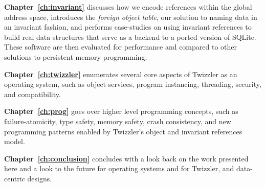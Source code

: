 \vspace{2em}

\noindent\textbf{Chapter~\ref{ch:invariant}} discusses how we encode references within the global address space, introduces the
\emph{foreign object table}, our solution to naming data in an invariant fashion, and performs case-studies on using
invariant references to build real data structures that serve as a backend to a ported version of SQLite. These software
are then evaluated for performance and compared to other solutions to persistent memory programming.

\vspace{2em}

\noindent\textbf{Chapter~\ref{ch:twizzler}} enumerates several core aspects of Twizzler as an operating system, such as object
services, program instancing, threading, security, and \unix compatibility.

\vspace{2em}

\noindent\textbf{Chapter~\ref{ch:prog}} goes over higher level programming concepts, such as failure-atomicity, type safety,
memory safety, crash consistency, and new programming patterns enabled by Twizzler's object and invariant references
model.

\vspace{2em}

\noindent\textbf{Chapter~\ref{ch:conclusion}} concludes with a look back on the work presented here and a look to the future for
operating systems and for Twizzler, and data-centric designs.

